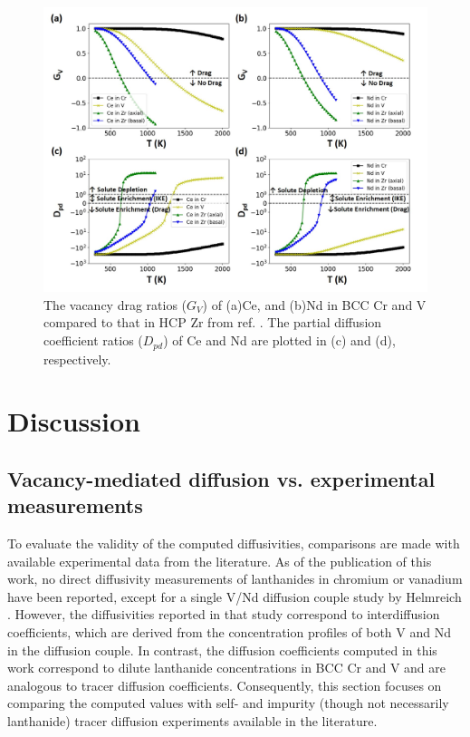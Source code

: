 \documentclass[preprint,12pt]{elsarticle}
\begin{document}
\begin{figure}[h]
    \centering
    \includegraphics[width=0.9\linewidth]{drag_ratios_pdc_cr_v.jpg}
    \caption{The vacancy drag ratios ($G_V$) of (a)Ce, and (b)Nd in BCC Cr and V compared to that in HCP Zr from ref. \cite{shousha2024first}. The partial diffusion coefficient ratios ($D_{pd}$) of Ce and Nd are plotted in (c) and (d), respectively.}
    \label{fig:drag_cr_v}
\end{figure}

\FloatBarrier
\section{Discussion}

\subsection{Vacancy-mediated diffusion vs. experimental measurements}

To evaluate the validity of the computed diffusivities, comparisons are made with available experimental data from the literature. As of the publication of this work, no direct diffusivity measurements of lanthanides in chromium or vanadium have been reported, except for a single V/Nd diffusion couple study by Helmreich \cite{helmreich_diffusion_2014}. However, the diffusivities reported in that study correspond to interdiffusion coefficients, which are derived from the concentration profiles of both V and Nd in the diffusion couple. In contrast, the diffusion coefficients computed in this work correspond to dilute lanthanide concentrations in BCC Cr and V and are analogous to tracer diffusion coefficients. Consequently, this section focuses on comparing the computed values with self- and impurity (though not necessarily lanthanide) tracer diffusion experiments available in the literature.
\end{document}

